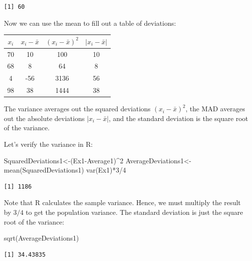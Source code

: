\documentclass[
  letterpaper,
  DIV=11,
  numbers=noendperiod]{scrreprt}
\newenvironment{Shaded}{\begin{snugshade}}{\end{snugshade}}
\newcommand{\DecValTok}[1]{\textcolor[rgb]{0.68,0.00,0.00}{#1}}
\newcommand{\FunctionTok}[1]{\textcolor[rgb]{0.28,0.35,0.67}{#1}}
\newcommand{\NormalTok}[1]{\textcolor[rgb]{0.00,0.23,0.31}{#1}}
\newcommand{\OtherTok}[1]{\textcolor[rgb]{0.00,0.23,0.31}{#1}}
\newcommand{\SpecialCharTok}[1]{\textcolor[rgb]{0.37,0.37,0.37}{#1}}
\begin{document}
\begin{verbatim}
[1] 60
\end{verbatim}

Now we can use the mean to fill out a table of deviations:

\begin{longtable}[]{@{}cccc@{}}
\toprule()
\(x_{i}\) & \(x_{i}-\bar{x}\) & \((x_{i}-\bar{x})^2\) &
\(|x_{i}-\bar{x}|\) \\
\midrule()
\endhead
70 & 10 & 100 & 10 \\
68 & 8 & 64 & 8 \\
4 & -56 & 3136 & 56 \\
98 & 38 & 1444 & 38 \\
\bottomrule()
\end{longtable}

The variance averages out the squared deviations \((x_{i}-\bar{x})^2\),
the MAD averages out the absolute deviations \(|x_{i}-\bar{x}|\), and
the standard deviation is the square root of the variance.

Let's verify the variance in R:

\begin{Shaded}
\begin{Highlighting}[numbers=left,,]
\NormalTok{SquaredDeviations1}\OtherTok{\textless{}{-}}\NormalTok{(Ex1}\SpecialCharTok{{-}}\NormalTok{Average1)}\SpecialCharTok{\^{}}\DecValTok{2}
\NormalTok{AverageDeviations1}\OtherTok{\textless{}{-}}\FunctionTok{mean}\NormalTok{(SquaredDeviations1)}
\FunctionTok{var}\NormalTok{(Ex1)}\SpecialCharTok{*}\DecValTok{3}\SpecialCharTok{/}\DecValTok{4}
\end{Highlighting}
\end{Shaded}

\begin{verbatim}
[1] 1186
\end{verbatim}

Note that R calculates the sample variance. Hence, we must multiply the
result by \(3/4\) to get the population variance. The standard deviation
is just the square root of the variance:

\begin{Shaded}
\begin{Highlighting}[numbers=left,,]
\FunctionTok{sqrt}\NormalTok{(AverageDeviations1)}
\end{Highlighting}
\end{Shaded}

\begin{verbatim}
[1] 34.43835
\end{verbatim}
\end{document}
